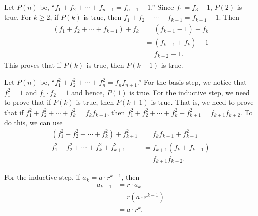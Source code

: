 \begin{list}{}
\item \begin{list}{\bf{(c)}}
\item Let $P( n )$ be, ``$f_1  + f_2  +  \cdots  + f_{n - 1}  = f_{n + 1}  - 1$.''  Since $f_1 = f_3 - 1$, $P ( 2 )$ is true.  For $k \geq 2$, if $P ( k )$ is true, then 
$f_1  + f_2  +  \cdots  + f_{k - 1}  = f_{k + 1}  - 1$.  Then
\[
\begin{aligned}
\left( f_1  + f_2  +  \cdots  + f_{k - 1} \right) + f_k  &= \left( f_{k + 1}  - 1 \right) + f_k \\
            &= \left( f_{k+1} + f_k \right) - 1 \\
            &= f_{k+2} - 1.
\end{aligned}
\]
This proves that if $P \left( k \right)$ is true, then $P \left( k + 1\right)$ is true.
\end{list}
\end{list}


\begin{list}{}
\item \begin{list}{\bf{(f)}}
\item Let $P( n )$ be, ``$f_1^2  + f_2^2  +  \cdots  + f_n^2  = f_n f_{n + 1} $.''  For the basis step, we notice that $f_1^2 = 1$ and $f_1 \cdot f_2 = 1$ and hence, $P(1)$ is true.  For the inductive step, we need to prove that if $P(k)$ is true, then $P(k+1)$ is true.  That is, we need to prove that if $f_1^2  + f_2^2  +  \cdots  + f_k^2  = f_k f_{k + 1} $, then 
$f_1^2  + f_2^2  +  \cdots  + f_k^2 + f_{k+1}^2  = f_{k+1} f_{k + 2} $.  To do this, we can use
\[
\begin{aligned}
\left( f_1^2  + f_2^2  +  \cdots  + f_k^2  \right) + f_{k+1}^2  &= 
f_k f_{k + 1} + f_{k+1}^2 \\
f_1^2  + f_2^2  +  \cdots  + f_k^2 + f_{k+1}^2  &= f_{k+1} \left( f_k + f_{k+1} \right) \\
                                                &= f_{k+1} f_{k+2}.         
\end{aligned}
\]
\end{list}
\end{list}



\begin{list}{\bf{\ref{exer:geomseq}.}}
\item For the inductive step, if $a_k = a \cdot r^{k - 1}$, then
\[
\begin{aligned}
a_{k+1} &= r \cdot a_k \\
        &= r \left( a \cdot r^{k-1} \right) \\
        &= a \cdot r^k. 
\end{aligned}
\]
\end{list}




